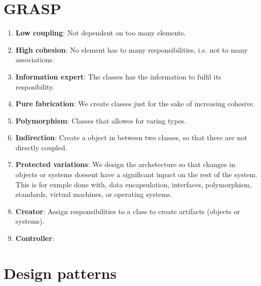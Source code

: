 \section{GRASP}
\begin{enumerate}
    \item \textbf{Low coupling}: 
      Not dependent on too many elements.
    \item \textbf{High cohesion}: 
      No element has to many responsibilities, i.e. not to many associations.
    \item \textbf{Information expert}:
      The classes has the information to fulfil its resposibility.
    \item \textbf{Pure fabrication}:
      We create classes just for the sake of increasing cohesive.
    \item \textbf{Polymorphism}: 
      Classes that allowes for varing types.
    \item \textbf{Indirection}:
      Create a object in between two classes, so that there are not directly coupled.
    \item \textbf{Protected variations}:
      We design the archetecture so that changes in objects or systems doesent have a significant inpact on the rest of the system. This is for exmple done with, data encapsulation, interfaces, polymorphism, standards, virtual machines, or operating systems.
    \item \textbf{Creator}:
      Assign responsibilities to a class to create artifacts (objects or systems).
    \item \textbf{Controller}:
\end{enumerate}


\section{Design patterns}

